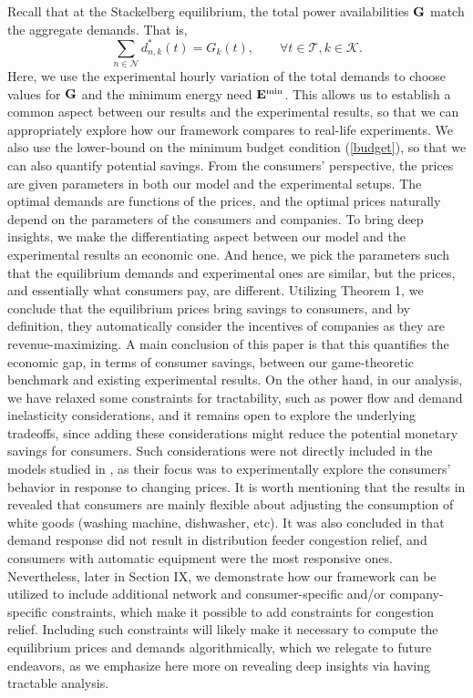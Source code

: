 Recall that at the Stackelberg equilibrium, the total power availabilities ${\bf G}$ match the aggregate demands. That is, 
$$ \sum_{n \in \mathcal{N}} d^*_{n,k}(t)=G_k(t), \qquad \forall t\in\mathcal{T}, k\in\mathcal{K}.$$ Here, we use the experimental hourly variation of the total demands to choose values for ${\bf G}$ and the minimum energy need ${\bf E}^{\min}$. This allows us to establish a common aspect between our results and the experimental results, so that we can appropriately explore how our framework compares to real-life experiments. We also use the lower-bound on the minimum budget condition (\ref{budget}), so that we can also quantify potential savings.  
{\color{blue}  From the consumers' perspective, the prices are given parameters in both our model and the experimental setups. The optimal demands are functions of the prices, and the optimal prices naturally depend on the parameters of the consumers and companies. To bring deep insights, we make the differentiating aspect between our model and the experimental results an economic one. And hence, we pick the parameters such that the equilibrium demands and experimental ones are similar, but the prices, and essentially what consumers pay, are different. Utilizing Theorem 1, we conclude that the equilibrium prices bring savings to consumers, and by definition, they automatically consider the incentives of companies as they are revenue-maximizing. A main conclusion of this paper is that this quantifies the economic gap, in terms of consumer savings, between our game-theoretic benchmark and existing experimental results. On the other hand, in our analysis, we have relaxed some constraints for tractability, such as power flow and demand inelasticity considerations, and it remains open to explore the underlying tradeoffs, since adding these considerations might reduce the potential monetary savings for consumers. Such considerations were not directly included in the models studied in \cite{ecogrid,dutch}, as their focus was to experimentally explore the consumers' behavior in response to changing prices. It is worth mentioning that the results in \cite{dutch} revealed that consumers are mainly flexible about adjusting the consumption of white goods (washing machine, dishwasher, etc). It was also concluded in \cite{ecogrid} that demand response did not result in distribution feeder congestion relief, and consumers with automatic equipment were the most responsive ones. Nevertheless, later in Section IX, we demonstrate how our framework can be utilized to include additional network and consumer-specific and/or company-specific constraints, which make it possible to add constraints for congestion relief. Including such constraints will likely make it necessary to compute the equilibrium prices and demands algorithmically, which we relegate to future endeavors, as we emphasize here more on revealing deep insights via having tractable analysis.}
